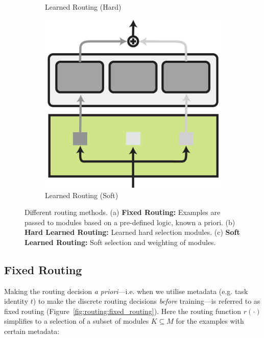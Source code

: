 \documentclass[10pt]{article} %
\begin{document}
\begin{figure}[t]
\begin{subfigure}{.25\linewidth}
        \caption{Learned Routing (Hard)}
    \label{fig:routing:hard_routing}
    \end{subfigure}
    \hspace{.5em}
    \begin{subfigure}{.25\linewidth}
    \centering
        \vspace{0.6em}
        \includegraphics[width=.99\linewidth]{img/soft_routing.pdf}  
        \caption{Learned Routing (Soft)}
        \label{fig:routing:soft_routing}
    \end{subfigure}
    \caption{ Different routing methods. (a) \textbf{Fixed Routing:} Examples are passed to modules based on a pre-defined logic, known a priori. (b) \textbf{Hard Learned Routing:} Learned hard selection modules. (c) \textbf{Soft Learned Routing:} Soft selection and weighting of modules.
    }
\label{fig:Routing}
\end{figure}

\subsection{Fixed Routing}
\label{sec:routing:deterministic}

Making the routing decision \textit{a priori}---i.e. when we utilise metadata (e.g. task identity $t$) to make the discrete routing decisions \textit{before} training---is referred to as fixed routing (Figure~\ref{fig:routing:fixed_routing}). Here the routing function $r(\cdot)$ simplifies to a  
selection of a subset of modules $K \subseteq M$ for the examples with certain metadata: 
\end{document}
